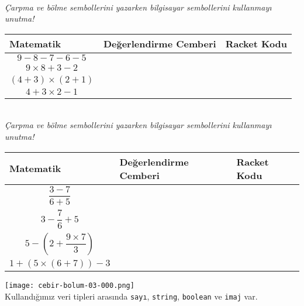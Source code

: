 \documentclass[12pt, a4paper]{article}
\begin{document}
\newpage
{}\\
\textit{Çarpma ve bölme sembollerini yazarken bilgisayar sembollerini kullanmayı unutma!}\\[2ex]
\begin{tabular}{| C{4cm} | C{6cm} | C{6cm} |  }
\hline
\bf Matematik&\bf Değerlendirme Cemberi&\bf Racket Kodu\\
\hline
\begin{displaymath} 9-8-7-6-5 \end{displaymath}  & &  \\[24ex]
\hline
\begin{displaymath} 9 \times 8 + 3 - 2 \end{displaymath} & &  \\[24ex]
\hline
\begin{displaymath} (4+3) \times (2+1) \end{displaymath}  & &  \\[24ex]
\hline
\begin{displaymath} 4+3 \times 2 - 1 \end{displaymath}   & &  \\[24ex]
\hline
\end{tabular}
\newpage
{}\\
\textit{Çarpma ve bölme sembollerini yazarken bilgisayar sembollerini kullanmayı unutma!}\\[2ex]
\begin{tabular}{| C{4cm} | C{6cm} | C{6cm} |  }
\hline
\bf Matematik&\bf Değerlendirme Cemberi&\bf Racket Kodu\\
\hline
\begin{displaymath} \frac {3 - 7 }{6 + 5} \end{displaymath}  & &  \\[24ex]
\hline
\begin{displaymath} 3 - \frac {7}{6} + 5 \end{displaymath} & &  \\[24ex]
\hline
\begin{displaymath} 5 - (2 + \frac{9 \times 7}{3}) \end{displaymath}  & &  \\[24ex]
\hline
\begin{displaymath} 1+(5 \times (6+7))-3 \end{displaymath}   & &  \\[24ex]
\hline
\end{tabular}
\newpage
\texttt{[image: cebir-bolum-03-000.png]}
\newpage
{}\\
Kullandığımız veri tipleri arasında \texttt{sayı}, \texttt{string}, \texttt{boolean} ve \texttt{imaj} var.
\end{document}
